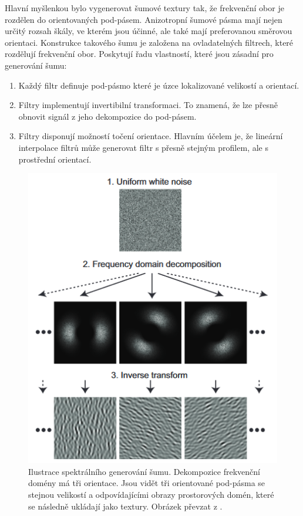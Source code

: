 Hlavní myšlenkou bylo vygenerovat šumové textury tak, že frekvenční obor je rozdělen do orientovaných pod-pásem. Anizotropní šumové pásma mají nejen určitý rozsah škály, ve kterém jsou účinné, ale také mají preferovanou směrovou orientaci. Konstrukce takového šumu je založena na ovladatelných filtrech, které rozdělují frekvenční obor. Poskytují řadu vlastností, které jsou zásadní pro generování šumu:
\begin{enumerate}
	\item Každý filtr definuje pod-pásmo které je úzce lokalizované velikostí a orientací.
	\item Filtry implementují invertibilní transformaci. To znamená, že lze přesně obnovit signál z jeho dekompozice do pod-pásem.
	\item Filtry disponují možností točení orientace. Hlavním účelem je, že lineární interpolace filtrů může generovat filtr s přesně stejným profilem, ale s prostřední orientací.
\end{enumerate}

\begin{figure}[H]
	\centering
	\includegraphics[scale=0.8]{obrazky-figures/AnisotropicNoise.png}
	\caption{Ilustrace spektrálního generování šumu. Dekompozice frekvenční domény má tři orientace. Jsou vidět tři orientované pod-pásma se stejnou velikostí a odpovídajícími obrazy prostorových domén, které se následně ukládají jako textury. Obrázek převzat z \cite{Goldberg08}.}
	\label{fig:AnisotropicNoise}
\end{figure}

